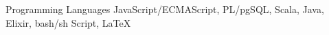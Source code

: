 \cvitem
{
  Programming Languages
}
{
  JavaScript/ECMAScript, PL/pgSQL, Scala, Java, Elixir, bash/sh Script, \LaTeX
}
